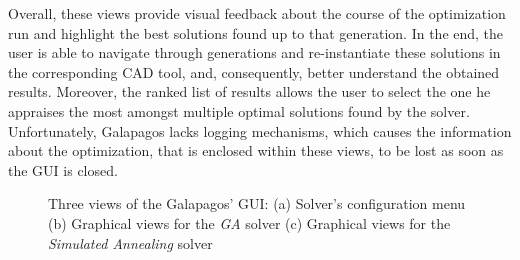 	Overall, these views provide visual feedback about the course of the optimization run and highlight the best solutions found up to that generation. In the end, the user is able to navigate through generations and re-instantiate these solutions in the corresponding \ac{CAD} tool, and, consequently, better understand the obtained results. Moreover, the ranked list of results allows the user to select the one he appraises the most amongst multiple optimal solutions found by the solver. Unfortunately, Galapagos lacks logging mechanisms, which causes the information about the optimization, that is enclosed within these views, to be lost as soon as the \ac{GUI} is closed. 
	\begin{figure}[]
		\centering
		\hfill
		\hfill
		
		\caption[Galapagos GUI]{Three views of the Galapagos' \ac{GUI}: (a) Solver's configuration menu (b) Graphical views for the \textit{\ac{GA}} solver (c) Graphical views for the \textit{Simulated Annealing} solver}
		\label{fig:galapagos}
	\end{figure}
	
